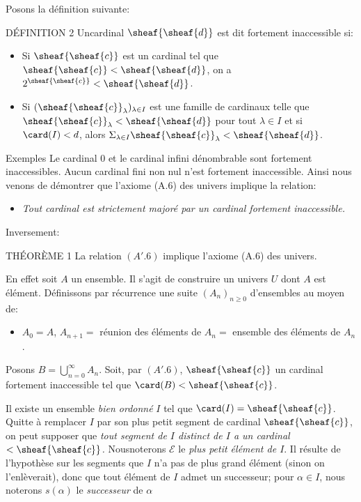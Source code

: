 Posons la définition suivante:

\begin{enonce*}{DÉFINITION 2}
Un\pageoriginale cardinal $\sheaf{\sheaf{d}}$ est dit fortement
inaccessible si:
\begin{itemize}
\item[(FI.1)] Si $\sheaf{\sheaf{c}}$ est un cardinal tel que
$\sheaf{\sheaf{c}}<\sheaf{\sheaf{d}}$, on a
$2^{\sheaf{\sheaf{c}}}<\sheaf{\sheaf{d}}$.

\item[(FI.2)] Si $(\sheaf{\sheaf{c}}_{\lambda})_{\lambda\in I}$ est une
famille de cardinaux telle que
$\sheaf{\sheaf{c}}_{\lambda}<\sheaf{\sheaf{d}}$ pour tout $\lambda
\in I$ et si $\card(I)<d$, alors $\Sigma_{\lambda\in
I}\sheaf{\sheaf{c}}_{\lambda}<\sheaf{\sheaf{d}}$.
\end{itemize}
\end{enonce*}

\begin{enonce*}[remark]{Exemples}
Le cardinal 0 et le cardinal infini dénombrable sont fortement
inaccessibles. Aucun cardinal fini non nul n'est fortement
inaccessible. Ainsi nous venons de démontrer que l'axiome (A.6) des
univers implique la relation:
\begin{itemize}
\item[${\rm (A'.6)}$] \emph{Tout cardinal est strictement majoré par
un cardinal fortement inaccessible.}
\end{itemize}
Inversement:
\end{enonce*}

\begin{enonce*}{THÉORÈME %
1} La relation $(A'.6)$ implique l'axiome (A.6) des univers.
\end{enonce*}
En effet soit $A$ un ensemble. Il s'agit de construire un univers
$U$ dont $A$ est élément. Définissons par récurrence une suite
$(A_n)_{n\geq 0}$ d'ensembles au moyen de:
\begin{itemize}
\item[(2)] $A_0=A$, $A_{n+1}=$ réunion des éléments de $A_n=$
ensemble des éléments de $A_n$.
\end{itemize}
\noindent Posons $B=\bigcup^\infty_{n=0} A_n$. Soit, par $(A'.6)$,
$\sheaf{\sheaf{c}}$ un cardinal fortement inaccessible tel que
$\card(B)<\sheaf{\sheaf{c}}$.

Il existe un ensemble \emph{bien ordonné} $I$ tel que
$\card(I)=\sheaf{\sheaf{c}}$. Quitte à remplacer $I$ par son plus
petit segment de cardinal $\sheaf{\sheaf{c}}$, on peut supposer que
\emph{tout segment de $I$ distinct de $I$ a un cardinal
$<\sheaf{\sheaf{c}}$.} Nous\pageoriginale noterons $\mathcal{E}$ le
\emph{plus petit élément de $I$}. Il résulte de l'hypothèse sur les
segments que $I$ n'a pas de plus grand élément (sinon on
l'enlèverait), donc que tout élément de $I$ admet un successeur;
pour $\alpha \in I$, nous noterons $s(\alpha)$ le \emph{successeur}
de $\alpha$

